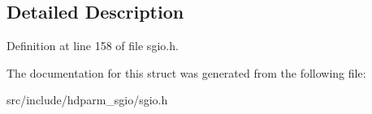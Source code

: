 \subsection{Detailed Description}


Definition at line 158 of file sgio.\+h.



The documentation for this struct was generated from the following file\+:\begin{DoxyCompactItemize}
\item 
src/include/hdparm\+\_\+sgio/sgio.\+h\end{DoxyCompactItemize}
